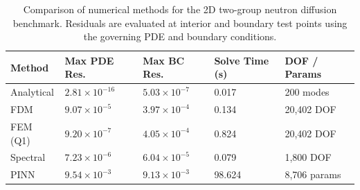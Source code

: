 \begin{table}[t]
\centering
\caption{Comparison of numerical methods for the 2D two-group neutron diffusion benchmark. Residuals are evaluated at interior and boundary test points using the governing PDE and boundary conditions.}
\label{tab:main_results}
\begin{tabular}{lllll}
\toprule
Method & Max PDE Res. & Max BC Res. & Solve Time (s) & DOF / Params \\
\midrule
  Analytical & $2.81{\times}10^{-16}$ & $5.03{\times}10^{-7}$ & 0.017 & 200 modes \\
  FDM        & $9.07{\times}10^{-5}$  & $3.97{\times}10^{-4}$ & 0.134 & 20,402 DOF \\
  FEM (Q1)   & $9.20{\times}10^{-7}$  & $4.05{\times}10^{-4}$ & 0.824 & 20,402 DOF \\
  Spectral   & $7.23{\times}10^{-6}$  & $6.04{\times}10^{-5}$ & 0.079 & 1,800 DOF \\
  PINN       & $9.54{\times}10^{-3}$  & $9.13{\times}10^{-3}$ & 98.624 & 8,706 params \\
\bottomrule
\end{tabular}
\end{table}
